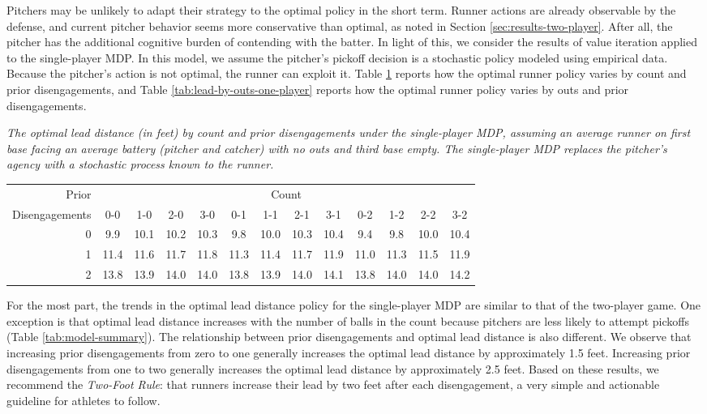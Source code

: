 \documentclass[opre,dblanonrev]{informs4}
\begin{document}
      Pitchers may be unlikely to adapt their strategy to the optimal policy in the short term. Runner actions are already observable by the defense, and current pitcher behavior seems more conservative than optimal, as noted in Section \ref{sec:results-two-player}. After all, the pitcher has the additional cognitive burden of contending with the batter. In light of this, we consider the results of value iteration applied to the single-player MDP. In this model, we assume the pitcher's pickoff decision is a stochastic policy modeled using empirical data. Because the pitcher's action is not optimal, the runner can exploit it. Table \ref{tab:lead-by-count-one-player} reports how the optimal runner policy varies by count and prior disengagements, and Table \ref{tab:lead-by-outs-one-player} reports how the optimal runner policy varies by outs and prior disengagements.

      \begin{table}
        \TABLE
        {\it The optimal lead distance (in feet) by count and prior disengagements under the single-player MDP, assuming an average runner on first base facing an average battery (pitcher and catcher) with no outs and third base empty. The single-player MDP replaces the pitcher's agency with a stochastic process known to the runner.
        \label{tab:lead-by-count-one-player}}
        {\begin{tabular}{r|cccc|cccc|cccc}
    Prior & \multicolumn{12}{c}{Count}\\
    Disengagements & 0-0 & 1-0 & 2-0 & 3-0 & 0-1 & 1-1 & 2-1 & 3-1 & 0-2 & 1-2 & 2-2 & 3-2 \\
      \hline
    0 & 9.9 & 10.1 & 10.2 & 10.3 & 9.8 & 10.0 & 10.3 & 10.4 & 9.4 & 9.8 & 10.0 & 10.4 \\ 
      1 & 11.4 & 11.6 & 11.7 & 11.8 & 11.3 & 11.4 & 11.7 & 11.9 & 11.0 & 11.3 & 11.5 & 11.9 \\ 
      2 & 13.8 & 13.9 & 14.0 & 14.0 & 13.8 & 13.9 & 14.0 & 14.1 & 13.8 & 14.0 & 14.0 & 14.2 \\ 
    \end{tabular}}
        {}
      \end{table}

      For the most part, the trends in the optimal lead distance policy for the single-player MDP are similar to that of the two-player game. One exception is that optimal lead distance increases with the number of balls in the count because pitchers are less likely to attempt pickoffs (Table \ref{tab:model-summary}). The relationship between prior disengagements and optimal lead distance is also different. We observe that increasing prior disengagements from zero to one generally increases the optimal lead distance by approximately 1.5 feet. Increasing prior disengagements from one to two generally increases the optimal lead distance by approximately 2.5 feet. Based on these results, we recommend the {\it Two-Foot Rule}: that runners increase their lead by two feet after each disengagement, a very simple and actionable guideline for athletes to follow.
      
\end{document}
